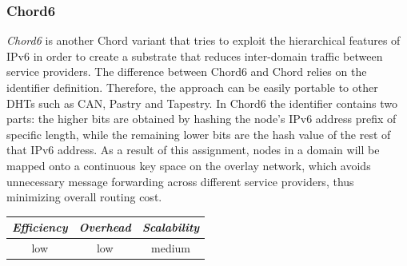 \subsubsection{Chord6}
\emph{Chord6} \cite{XZHL2005} is another Chord variant that tries to
exploit the hierarchical features of IPv6 in order to create a substrate that
reduces inter-domain traffic between service providers. The difference between
Chord6 and Chord relies on the identifier definition. Therefore, the approach
can be easily portable to other DHTs such as CAN, Pastry and Tapestry. In Chord6
the identifier contains two parts: the higher bits are obtained by hashing the
node's IPv6 address prefix of specific length, while the remaining lower bits
are the hash value of the rest of that IPv6 address. As a result of this
assignment, nodes in a domain will be mapped onto a continuous key space on the
overlay network, which avoids unnecessary message forwarding across different
service providers, thus minimizing overall routing cost.

\begin{center}
\begin{tabular}{ccc}
\emph{Efficiency} & \emph{Overhead} & \emph{Scalability} \\
\hline
low &
low &
medium
\end{tabular}
\end{center}


